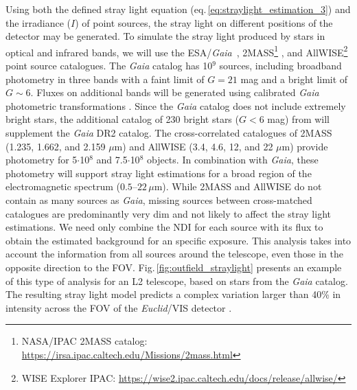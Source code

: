 \documentclass[usenames,dvipsnames,modern]{CLASS_FILES/aastex631}  %
\newcommand{\Euclid}{\emph{Euclid}}
\newcommand{\Gaia}{\emph{Gaia}}
\begin{document}
Using both the defined stray light equation (eq.\,\ref{eq:straylight_estimation_3}) and the irradiance ($I$) of point sources, the stray light on different positions of the detector may be generated. To simulate the stray light produced by stars in optical and infrared bands, we will use the ESA/\Gaia\ \citep{collaboration+2016aap595_2, collaboration+2018aap616_1}, 2MASS\footnote{NASA/IPAC 2MASS catalog: \url{https://irsa.ipac.caltech.edu/Missions/2mass.html}} \citep{skrutskie+2006aj131_1163}, and AllWISE\footnote{WISE Explorer IPAC: \url{https://wise2.ipac.caltech.edu/docs/release/allwise/}} \citep{cutri+2013misc} point source catalogues. The \emph{Gaia} catalog has 10$^9$ sources, including broadband photometry in three bands with a faint limit of $G = 21$ mag and a bright limit of $G\sim6$. Fluxes on additional bands will be generated using calibrated \emph{Gaia} photometric transformations \citep{evans+2018aap616_4}. Since the \emph{Gaia} catalog does not include extremely bright stars, the additional catalog of 230 bright stars ($G<6$ mag) from \citet[][]{sahlmann+2016inproceedings_99042E} will supplement the \emph{Gaia} DR2 catalog. The cross-correlated catalogues of 2MASS (1.235, 1.662, and 2.159 $\mu$m) and AllWISE (3.4, 4.6, 12, and 22 $\mu$m) provide photometry for 5$\cdot$10$^8$ and 7.5$\cdot$10$^8$ objects. In combination with \Gaia, these photometry will support stray light estimations for a broad region of the electromagnetic spectrum ($0.5$--$22\,\mu$m). While 2MASS and AllWISE do not contain as many sources as \Gaia, missing sources between cross-matched catalogues are predominantly very dim and not likely to affect the stray light estimations. We need only  combine the NDI for each source with its flux to obtain the estimated background for an specific exposure. This analysis takes into account the information from all sources around the telescope, even those in the opposite direction to the FOV. Fig.\,\ref{fig:outfield_straylight} presents an example of this type of analysis for an L2 telescope, based on stars from the \emph{Gaia} catalog. The resulting stray light model predicts a complex variation larger than 40\% in intensity across the FOV of the \Euclid/VIS detector \citep{borlaff+2021apj921_128}.\\
\end{document}
